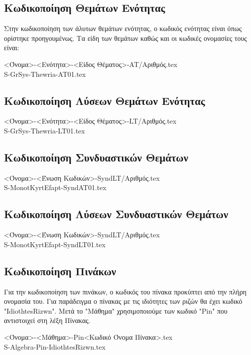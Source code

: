 \documentclass[11pt,a4paper]{book}
\newcommand{\xr}[1]{\textcolor{red!80!black}{#1}}
\begin{document}
\subsection{Κωδικοποίηση Θεμάτων Ενότητας}
Στην κωδικοποίηση των άλυτων θεμάτων ενότητας, ο κωδικός ενότητας είναι όπως ορίστηκε προηγουμένως. Τα είδη των θεμάτων καθώς και οι κωδικές ονομασίες τους είναι:

\begin{center}
<Όνομα>-<Ενότητα>-<Είδος Θέματος>-AT/Αριθμός.tex\\
\xr{S}-GrSys-\xr{Thewria}-AT01.tex
\end{center}
\subsection{Κωδικοποίηση Λύσεων Θεμάτων Ενότητας}
\begin{center}
<Όνομα>-<Ενότητα>-<Είδος Θέματος>-LT/Αριθμός.tex\\
\xr{S}-GrSys-\xr{Thewria}-LT01.tex
\end{center}
\subsection{Κωδικοποίηση Συνδυαστικών Θεμάτων}
\begin{center}
<Όνομα>-<Ένωση Κωδικών>-SyndLT/Αριθμός.tex\\
\xr{S}-MonotKyrtEfapt-\xr{SyndAT01}.tex
\end{center}
\subsection{Κωδικοποίηση Λύσεων Συνδυαστικών Θεμάτων}
\begin{center}
<Όνομα>-<Ένωση Κωδικών>-SyndLT/Αριθμός.tex\\
\xr{S}-MonotKyrtEfapt-\xr{SyndLT01}.tex
\end{center}
\subsection{Κωδικοποίηση Πινάκων}
Για την κωδικοποίηση των πινάκων, ο κωδικός του πίνακα προκύπτει από την πλήρη ονομασία του. Για παράδειγμα ο πίνακας με τις ιδιότητες των ριζών θα έχει κωδικό "\xr{IdiothtesRizwn}". Μετά το "Μάθημα" χρησιμοποιούμε των κωδικό "\xr{Pin}" που αντιστοιχεί στη λέξη Πίνακας.
\begin{center}
<Όνομα>-<Μάθημα>-Pin<Κωδικό Όνομα Πίνακα>.tex\\
\xr{S}-Algebra-\xr{Pin}-IdiothtesRizwn.tex
\end{center}
\end{document}
